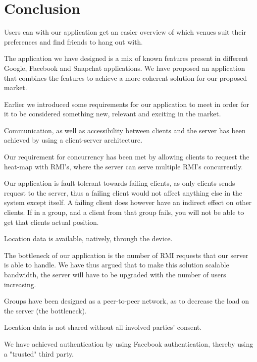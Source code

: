 \section{Conclusion}

Users can with our application get an easier overview of which venues suit their preferences and find friends to hang out with.

The application we have designed is a mix of known features present in different Google, Facebook and Snapchat applications. We have proposed an application that combines the features to achieve a more coherent solution for our proposed market. \medskip

Earlier we introduced some requirements for our application to meet in order for it to be considered something new, relevant and exciting in the market.

Communication, as well as accessibility between clients and the server has been achieved by using a client-server architecture.

Our requirement for concurrency has been met by allowing clients to request the heat-map with RMI's, where the server can serve multiple RMI's concurrently.

Our application is fault tolerant towards failing clients, as only clients sends request to the server, thus a failing client would not affect anything else in the system except itself. A failing client does however have an indirect effect on other clients. If in a group, and a client from that group fails, you will not be able to get that clients actual position.

Location data is available, natively, through the device. 


The bottleneck of our application is the number of RMI requests that our server is able to handle. We have thus argued that to make this solution scalable bandwidth, the server will have to be upgraded with the number of users increasing.


Groups have been designed as a peer-to-peer network, as to decrease the load on the server (the bottleneck).


    Location data is not shared without all involved parties' consent.
    
    We have achieved authentication by using Facebook authentication, thereby using a "trusted" third party.
    
